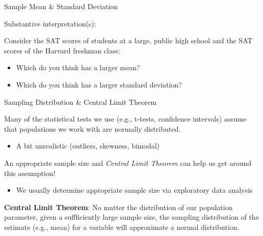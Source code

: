 \documentclass[
  8pt,
  ignorenonframetext,
  dvipsnames]{beamer}
\providecommand{\tightlist}{%
  \setlength{\itemsep}{0pt}\setlength{\parskip}{0pt}}
\renewcommand{\textbf}[1]{{\color{darkgray}\bfseries\fontfamily{Montserrat-TOsF}#1}}
\let\olditem\item
\renewcommand{\item}{%
  \olditem\vspace{4pt}
}
\begin{document}
\begin{frame}{Sample Mean \& Standard Deviation}
\protect\hypertarget{sample-mean-standard-deviation-1}{}

Substantive interpretation(s):

Consider the SAT scores of students at a large, public high school and
the SAT scores of the Harvard freshman class:

\begin{itemize}
\item
  Which do you think has a larger mean?
\item
  Which do you think has a larger standard deviation?
\end{itemize}

\end{frame}

\begin{frame}{Sampling Distribution \& Central Limit Theorem}
\protect\hypertarget{sampling-distribution-central-limit-theorem}{}

Many of the statistical tests we use (e.g., t-tests, confidence
intervals) assume that populations we work with are normally
distributed.

\begin{itemize}
\tightlist
\item
  A bit unrealistic (outliers, skewness, bimodal)
\end{itemize}

\medskip

An appropriate sample size and \emph{Central Limit Theorem} can help us
get around this assumption!

\begin{itemize}
\tightlist
\item
  We usually determine appropriate sample size via exploratory data
  analysis
\end{itemize}

\medskip

\textbf{Central Limit Theorem}: No matter the distribution of our
population parameter, given a suffficiently large sample size, the
sampling distribution of the estimate (e.g., mean) for a variable will
approximate a normal distribution.

\end{frame}
\end{document}
